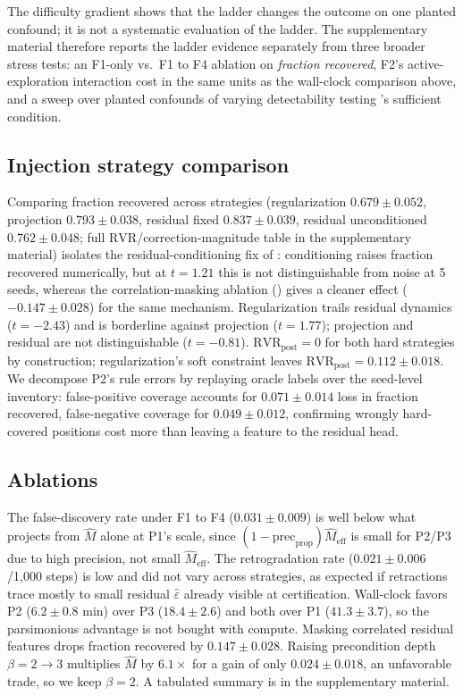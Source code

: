 \documentclass[letterpaper]{article} %
\let\autoref\Cref
\theoremstyle{plain}
\theoremstyle{definition}
\theoremstyle{remark}
\begin{document}
The difficulty gradient shows that the ladder changes the outcome on one planted confound; it is not a systematic evaluation of the ladder. The supplementary material therefore reports the ladder evidence separately from three broader stress tests: an F1-only vs.\ F1 to F4 ablation on \emph{fraction recovered}, F2's active-exploration interaction cost in the same units as the wall-clock comparison above, and a sweep over planted confounds of varying detectability testing \autoref{thm:t7}'s sufficient condition.

\subsection{Injection strategy comparison}
\label{sec:exp-injection}

Comparing fraction recovered across strategies (regularization $0.679\pm0.052$, projection $0.793\pm0.038$, residual fixed $0.837\pm0.039$, residual unconditioned $0.762\pm0.048$; full $\mathrm{RVR}$/correction-magnitude table in the supplementary material) isolates the residual-conditioning fix of \autoref{sec:injection}: conditioning raises fraction recovered numerically, but at $t=1.21$ this is not distinguishable from noise at 5 seeds, whereas the correlation-masking ablation (\autoref{sec:exp-ablations}) gives a cleaner effect ($-0.147\pm0.028$) for the same mechanism. Regularization trails residual dynamics ($t=-2.43$) and is borderline against projection ($t=1.77$); projection and residual are not distinguishable ($t=-0.81$). $\mathrm{RVR}_{\mathrm{post}}=0$ for both hard strategies by construction; regularization's soft constraint leaves $\mathrm{RVR}_{\mathrm{post}}=0.112\pm0.018$. We decompose P2's rule errors by replaying oracle labels over the seed-level inventory: false-positive coverage accounts for $0.071\pm0.014$ loss in fraction recovered, false-negative coverage for $0.049\pm0.012$, confirming wrongly hard-covered positions cost more than leaving a feature to the residual head.

\subsection{Ablations}
\label{sec:exp-ablations}

The false-discovery rate under F1 to F4 ($0.031\pm0.009$) is well below what \autoref{cor:t2b} projects from $\hat M$ alone at P1's scale, since $(1-\mathrm{prec}_{\mathrm{prop}})\hat M_{\mathrm{eff}}$ is small for P2/P3 due to high precision, not small $\hat M_{\mathrm{eff}}$. The retrogradation rate ($0.021\pm0.006$/1,000 steps) is low and did not vary across strategies, as expected if retractions trace mostly to small residual $\hat\varepsilon$ already visible at certification. Wall-clock favors P2 ($6.2\pm0.8$ min) over P3 ($18.4\pm2.6$) and both over P1 ($41.3\pm3.7$), so the parsimonious advantage is not bought with compute. Masking correlated residual features drops fraction recovered by $0.147\pm0.028$. Raising precondition depth $\beta{=}2{\to}3$ multiplies $\hat M$ by $6.1\times$ for a gain of only $0.024\pm0.018$, an unfavorable trade, so we keep $\beta=2$. A tabulated summary is in the supplementary material.
\end{document}
